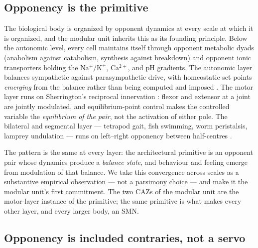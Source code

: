 \documentclass{article}
\begin{document}
\subsection{Opponency is the primitive}\label{sec:atom-opponency}

The biological body is organized by opponent dynamics at every scale
at which it is organized, and the modular unit inherits this as its founding
principle.  Below the autonomic level, every cell maintains itself
through opponent metabolic dyads (anabolism against catabolism,
synthesis against breakdown) and opponent ionic transporters holding
the $\mathrm{Na^+\!/K^+}$, $\mathrm{Ca^{2+}}$, and pH gradients.  The
autonomic layer balances sympathetic against parasympathetic drive,
with homeostatic set points \emph{emerging} from the balance rather
than being computed and imposed
\citep{Damasio1999_Feeling,Damasio2010_Self}.  The motor layer runs on
Sherrington's reciprocal innervation
\citep{Sherrington1906_IntegrativeAction,sherrington1905reciprocal}:
flexor and extensor at a joint are jointly modulated, and
equilibrium-point control
\citep{Feldman1986_EquilibriumPoint,Feldman2015ReferentControl} makes
the controlled variable the \emph{equilibrium of the pair}, not the
activation of either pole.  The bilateral and segmental layer ---
tetrapod gait, fish swimming, worm peristalsis, lamprey undulation ---
runs on left--right opponency between half-centres
\citep{Grillner2006Lamprey,Grillner2020PrinciplesMotorControl,MarderBucher2001CB}.

The pattern is the same at every layer: the architectural primitive is
an opponent pair whose dynamics produce a \emph{balance state}, and
behaviour and feeling emerge from modulation of that balance.  We take
this convergence across scales as a substantive empirical observation
--- not a parsimony choice --- and make it the modular unit's first
commitment.  The two CAZs of the modular unit are the motor-layer instance of
the primitive; the same primitive is what makes every other layer, and
every larger body, an SMN.

\subsection{Opponency is included contraries, not a servo}\label{sec:atom-invertibility}
\end{document}
